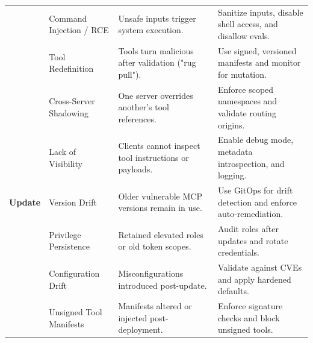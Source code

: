 \documentclass{article}
\begin{document}
\begin{table}[ht]
\begin{tabularx}{\textwidth}{|
    >{\centering\arraybackslash}p{2.1cm}|
    >{\raggedright\arraybackslash}X|
    >{\raggedright\arraybackslash}X|
    >{\raggedright\arraybackslash}X|}
    & Command Injection / RCE 
    & Unsafe inputs trigger system execution.
    & Sanitize inputs, disable shell access, and disallow evals. \\

    & Tool Redefinition 
    & Tools turn malicious after validation ("rug pull").
    & Use signed, versioned manifests and monitor for mutation. \\

    & Cross-Server Shadowing 
    & One server overrides another’s tool references.
    & Enforce scoped namespaces and validate routing origins. \\

    & Lack of Visibility 
    & Clients cannot inspect tool instructions or payloads.
    & Enable debug mode, metadata introspection, and logging. \\

    \hline

    \textbf{Update} 
    & Version Drift 
    & Older vulnerable MCP versions remain in use.
    & Use GitOps for drift detection and enforce auto-remediation. \\

    & Privilege Persistence 
    & Retained elevated roles or old token scopes.
    & Audit roles after updates and rotate credentials. \\

    & Configuration Drift 
    & Misconfigurations introduced post-update.
    & Validate against CVEs and apply hardened defaults. \\

    & Unsigned Tool Manifests 
    & Manifests altered or injected post-deployment.
    & Enforce signature checks and block unsigned tools. \\

    \hline
  \end{tabularx}
\end{table}





\end{document}
